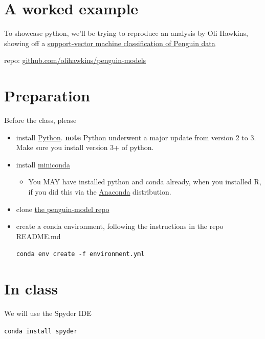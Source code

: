 \documentclass[
]{book}
\providecommand{\tightlist}{%
  \setlength{\itemsep}{0pt}\setlength{\parskip}{0pt}}
\begin{document}
\hypertarget{a-worked-example}{%
\section{A worked example}\label{a-worked-example}}

To showcase python, we'll be trying to reproduce an analysis by Oli Hawkins, showing off a \href{https://twitter.com/olihawkins/status/1285664698201972736}{support-vector machine classification of Penguin data}

repo: \href{https://github.com/olihawkins/penguin-models}{github.com/olihawkins/penguin-models}

\hypertarget{preparation}{%
\section{Preparation}\label{preparation}}

Before the class, please

\begin{itemize}
\item
  install \href{https://www.python.org/downloads/}{Python}. \textbf{note} Python underwent a major update from version 2 to 3. Make sure you install version 3+ of python.
\item
  install \href{https://docs.conda.io/en/latest/miniconda.html}{miniconda}

  \begin{itemize}
  \tightlist
  \item
    You MAY have installed python and conda already, when you installed R, if you did this via the \href{https://www.anaconda.com/}{Anaconda} distribution.
  \end{itemize}
\item
  clone \href{https://github.com/olihawkins/penguin-models}{the penguin-model repo}
\item
  create a conda environment, following the instructions in the repo README.md

  \texttt{conda\ env\ create\ -f\ environment.yml}
\end{itemize}

\hypertarget{in-class}{%
\section{In class}\label{in-class}}

We will use the Spyder IDE

\texttt{conda\ install\ spyder}
\end{document}
